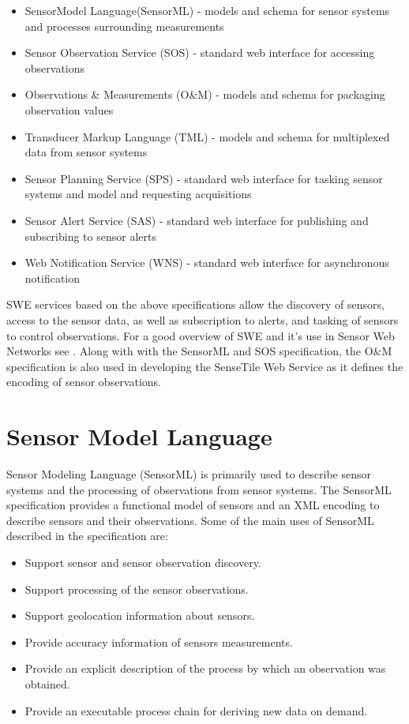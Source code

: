 \documentclass[]{final_report}
\begin{document}
\begin{itemize}
\item  SensorModel Language(SensorML) - models and schema for sensor systems and processes surrounding measurements
\item  Sensor Observation Service (SOS) - standard web interface for accessing observations
\item  Observations \& Measurements (O\&M) - models and schema for packaging observation values
\item  Transducer Markup Language (TML) - models and schema for multiplexed data from sensor systems
\item  Sensor Planning Service (SPS) - standard web interface for tasking sensor systems and model and requesting acquisitions
\item  Sensor Alert Service (SAS) - standard web interface for publishing and subscribing to sensor alerts
\item  Web Notification Service (WNS) - standard web interface for asynchronous notification
\end{itemize}

SWE services based on the above specifications allow the discovery of sensors, access to the sensor data, as well as subscription to alerts, and tasking of sensors to control observations. For a good overview of SWE and it's use in Sensor Web Networks see \cite{SWEArchref}.  Along with with the SensorML and SOS specification, the O\&M specification is also used in developing the SenseTile Web Service as it defines the encoding of sensor observations. 


\section{Sensor Model Language}\label{SMLsection}
Sensor Modeling Language (SensorML) is primarily used to describe sensor systems and the processing of observations from sensor systems. The SensorML specification\cite{SMLref} provides a functional model of sensors and an XML encoding to describe sensors and their observations. Some of the main uses of SensorML described in the specification are:
\begin{itemize}
\item Support sensor and sensor observation discovery.
\item Support processing of the sensor observations.
\item Support geolocation information about sensors.
\item Provide accuracy information of sensors measurements.
\item Provide an explicit description of the process by which an observation was obtained.
\item Provide an executable process chain for deriving new data on demand.
\end{itemize}
\end{document}
